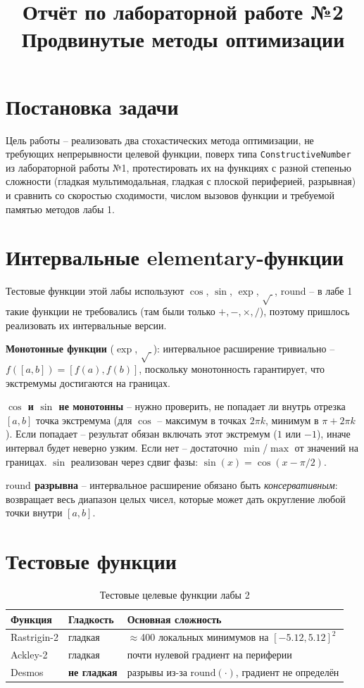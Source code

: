 \documentclass[12pt,a4paper]{article}
\title{Отчёт по лабораторной работе №2 \\ \large Продвинутые методы оптимизации}
\author{}
\date{}
\begin{document}
\maketitle
\tableofcontents
\newpage

\section{Постановка задачи}

Цель работы -- реализовать два стохастических метода оптимизации, не
требующих непрерывности целевой функции, поверх типа
\texttt{ConstructiveNumber} из лабораторной работы №1, протестировать
их на функциях с разной степенью сложности (гладкая мультимодальная,
гладкая с плоской периферией, разрывная) и сравнить со скоростью
сходимости, числом вызовов функции и требуемой памятью методов лабы 1.

\section{Интервальные elementary-функции}

Тестовые функции этой лабы используют $\cos$, $\sin$, $\exp$, $\sqrt{\ }$,
$\mathrm{round}$ -- в лабе 1 такие функции не требовались (там были только
$+,-,\times,/$), поэтому пришлось реализовать их интервальные версии.

\textbf{Монотонные функции} ($\exp$, $\sqrt{\ }$): интервальное расширение
тривиально -- $f([a,b])=[f(a),f(b)]$, поскольку монотонность гарантирует,
что экстремумы достигаются на границах.

\textbf{$\cos$ и $\sin$ не монотонны} -- нужно проверить, не попадает ли
внутрь отрезка $[a,b]$ точка экстремума (для $\cos$ -- максимум в точках
$2\pi k$, минимум в $\pi+2\pi k$). Если попадает -- результат обязан
включать этот экстремум ($1$ или $-1$), иначе интервал будет неверно
узким. Если нет -- достаточно $\min$/$\max$ от значений на границах.
$\sin$ реализован через сдвиг фазы: $\sin(x)=\cos(x-\pi/2)$.

\textbf{$\mathrm{round}$ разрывна} -- интервальное расширение обязано
быть \emph{консервативным}: возвращает весь диапазон целых чисел,
которые может дать округление любой точки внутри $[a,b]$.

\section{Тестовые функции}

\begin{table}[h]
\centering
\begin{tabular}{lll}
\toprule
Функция & Гладкость & Основная сложность \\
\midrule
Rastrigin-2 & гладкая & $\approx$400 локальных минимумов на $[-5.12,5.12]^2$ \\
Ackley-2 & гладкая & почти нулевой градиент на периферии \\
Desmos & \textbf{не гладкая} & разрывы из-за $\mathrm{round}(\cdot)$, градиент не определён \\
\bottomrule
\end{tabular}
\caption{Тестовые целевые функции лабы 2}
\end{table}
\end{document}
